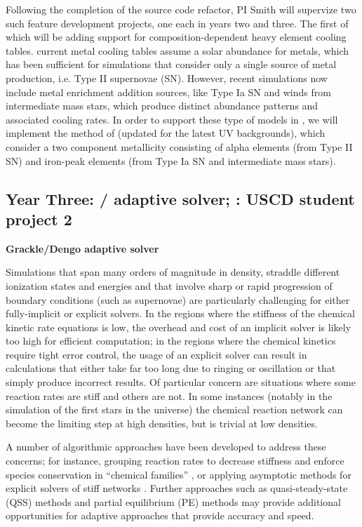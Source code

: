 Following the completion of the source code refactor, PI Smith will
supervize two such feature development projects, one each in years two
and three.  The first of which will be adding support for
composition-dependent heavy element cooling tables.  
current metal cooling tables assume a solar abundance for metals,
which has been sufficient for simulations that consider only a single
source of metal production, i.e. Type II supernovae (SN). However, recent
simulations \citep[e.g.,][]{2014MNRAS.444.1518V, 2015MNRAS.446..521S}
now include metal enrichment addition sources, like Type Ia SN
and winds from intermediate mass stars, which produce distinct abundance
patterns and associated cooling rates.  In order to support these type
of models in \grackle{}, we will implement the method of
\citet{2013MNRAS.433.3005D} (updated for the latest UV backgrounds),
which consider a two component metallicity consisting of alpha
elements (from Type II SN) and iron-peak elements (from Type Ia SN and
intermediate mass stars).

\subsection{Year Three: \grackle{}/\dengo{} adaptive solver;
  \grackle{}: USCD student project 2}

\noindent \textbf{Grackle/Dengo adaptive solver}

Simulations that span many orders of magnitude in density, straddle different
ionization states and energies and that involve sharp or rapid progression of
boundary conditions (such as supernovae) are particularly challenging for
either fully-implicit or explicit solvers.  In the regions where the stiffness
of the chemical kinetic rate equations is low, the overhead and cost of an
implicit solver is likely too high for efficient computation; in the regions
where the chemical kinetics require tight error control, the usage of an
explicit solver can result in calculations that either take far too long due to
ringing or oscillation or that simply produce incorrect results.  Of particular
concern are situations where some reaction rates are stiff and others are not.
In some instances (notably in the simulation of the first stars in the
universe) the chemical reaction network can become the limiting step at high
densities, but is trivial at low densities.

A number of algorithmic approaches have been developed to address these concerns;
for instance, grouping reaction rates to decrease stiffness and enforce species
conservation in ``chemical families''
\citep{doi:10.1002/kin.550100907, SANDU19973151}, or applying 
asymptotic methods for explicit solvers of stiff networks
\citep{1749-4699-6-1-015001}.  Further approaches such as 
quasi-steady-state (QSS) methods \citep{1749-4699-6-1-015002} and 
partial equilibrium (PE) methods \citep{1749-4699-6-1-015003} may provide
additional opportunities for adaptive approaches that provide accuracy and
speed.

